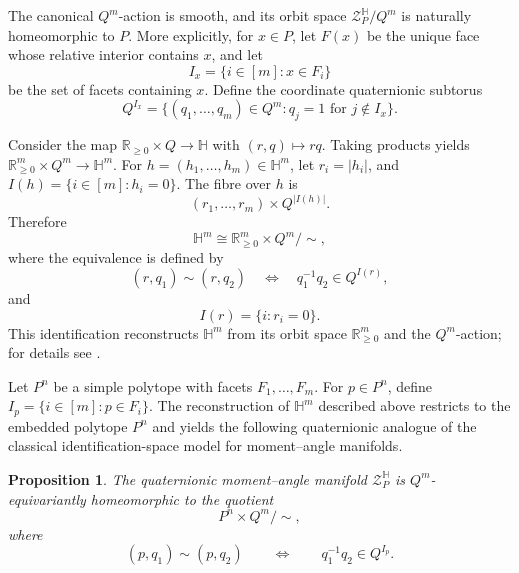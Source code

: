 \documentclass[11pt,a4paper]{article}
\numberwithin{equation}{section}
\newtheorem{prop}[definition]{Proposition}
\theoremstyle{named}
\begin{document}
The canonical \(Q^m\)-action is smooth, and its orbit space \(\mathcal Z_P^{\mathbb H}/Q^m\) is naturally homeomorphic to \(P\). More explicitly, for \(x\in P\), let \(F(x)\) be the unique face whose
relative interior contains \(x\), and let
\[
    I_x=\{i\in[m]:x\in F_i\}
\]
be the set of facets containing \(x\).  Define the coordinate
quaternionic subtorus
\[
    Q^{I_x}
    =
    \{(q_1,\ldots,q_m)\in Q^m:
    q_j=1 \text{ for } j\notin I_x\}.
\]

Consider the map \(\mathbb R_{\ge0}\times Q \longrightarrow \mathbb H\) with \((r,q)\longmapsto rq\). Taking products yields \(\mathbb R_{\ge0}^m\times Q^m \longrightarrow \mathbb H^m\). For
\(h=(h_1,\ldots,h_m)\in \mathbb H^m\), let \(r_i=|h_i|\), and \(I(h)=\{i\in[m]:h_i=0\}\). The fibre over $h$ is
\[
(r_1,\ldots,r_m)\times Q^{|I(h)|}.
\]
\noindent
Therefore
\[
\mathbb H^m
\cong
\mathbb R_{\ge0}^m\times Q^m/\!\sim,
\]
where the equivalence is defined by
\[
(r,q_1)\sim(r,q_2)
\quad\Longleftrightarrow\quad
q_1^{-1}q_2\in Q^{I(r)},
\]
and
\[
I(r)=\{i:r_i=0\}.
\]
This identification reconstructs $\mathbb H^m$ from its orbit space $\mathbb R_{\ge0}^m$ and the $Q^m$-action; for details see \cite[\S3.2]{ho}.

Let \(P^n\) be a simple polytope with facets \(F_1,\ldots,F_m\). For \(p\in P^n\), define \(I_p = \{i\in[m]:p\in F_i\}\). The reconstruction of \(\mathbb H^m\) described above restricts to the embedded polytope \(P^n\) and yields the following quaternionic analogue of the classical identification-space model for moment--angle manifolds.


\begin{prop}
The quaternionic moment--angle manifold \(\mathcal Z_P^{\mathbb H}\) is
\(Q^m\)-equivariantly homeomorphic to the quotient
\[
P^n\times Q^m/\!\sim ,
\]
where
\[
(p,q_1)\sim(p,q_2)
\qquad\Longleftrightarrow\qquad
q_1^{-1}q_2\in Q^{I_p}.
\]
\end{prop}
\end{document}
